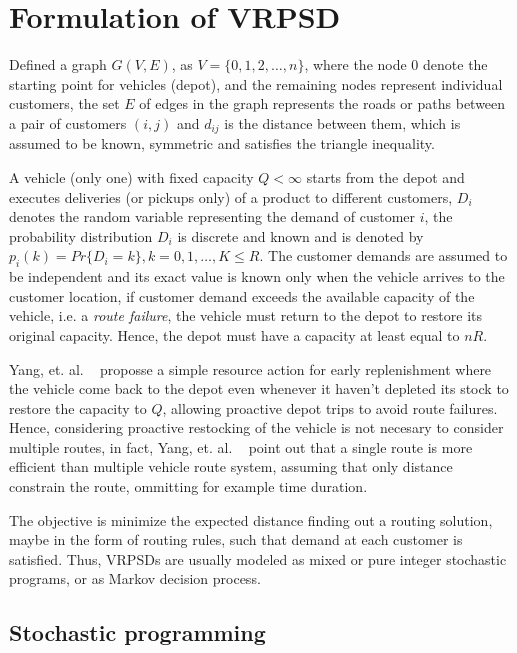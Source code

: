 \section{Formulation of VRPSD}\label{sec:Form_VRPSD}

Defined a graph $G(V,E)$, as $V = \{0, 1, 2,\ldots,n\}$, where the node 0 denote the starting point for vehicles (depot), and the remaining nodes represent individual customers, the set $E$ of edges in the graph represents the roads or paths between a pair of customers $(i,j)$ and $d_{ij}$ is the distance between them, which is assumed to be known, symmetric and satisfies the triangle inequality.

A vehicle (only one) with fixed capacity $Q < \infty$ starts from the depot and executes deliveries (or pickups only) of a product to different customers, $D_i$ denotes the random variable representing the demand of customer $i$, the probability distribution $D_i$ is discrete and known and is denoted by $p_i(k)= Pr\{D_i=k\}, k=0,1,\ldots,K \leq R$. The customer demands are assumed to be independent and its exact value is known only when the vehicle arrives to the customer location, if customer demand exceeds the available capacity of the vehicle, i.e. a \textit{route failure}, the vehicle must return to the depot to restore its original capacity. Hence, the depot must have a capacity at least equal to $nR$. %

Yang, et. al. ~\cite{yang_stochastic_2000} proposse a simple resource action for early replenishment where the vehicle come back to the depot even whenever it haven't depleted its stock to restore the capacity to $Q$, allowing proactive depot trips to avoid route failures. Hence, considering proactive restocking of the vehicle is not necesary to consider multiple routes, in fact, Yang, et. al. ~\cite{yang_stochastic_2000} point out that a single route is more efficient than multiple vehicle route system, assuming that only distance constrain the route, ommitting for example time duration.

The objective is minimize the expected distance finding out a routing solution, maybe in the form of routing rules, such that demand
at each customer is satisﬁed. Thus, VRPSDs are usually modeled as mixed or pure integer stochastic programs, or as Markov decision process.


\subsection{Stochastic programming}

